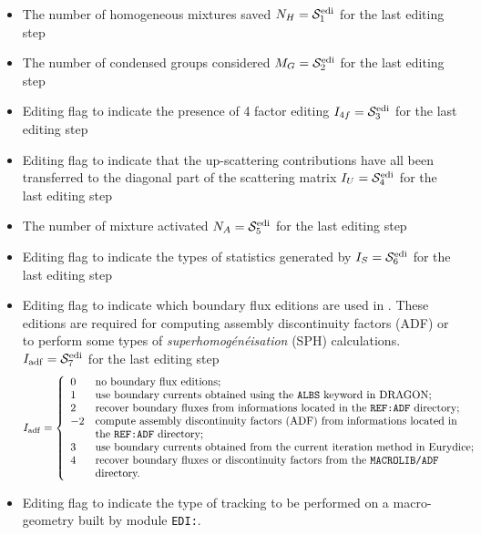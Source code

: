 \begin{itemize}
\item The number of homogeneous mixtures saved $N_{H}=\mathcal{S}^{\rm edi}_{1}$ for the last editing step
\item The number of condensed groups considered $M_{G}=\mathcal{S}^{\rm edi}_{2}$  for the last editing step
\item Editing flag to indicate the presence of 4 factor editing $I_{4f}=\mathcal{S}^{\rm edi}_{3}$ for
the last editing step
\item Editing flag to indicate that the up-scattering contributions have all been transferred to
      the diagonal part of the scattering matrix $I_{U}=\mathcal{S}^{\rm edi}_{4}$ for the last editing step
\item The number of mixture activated $N_{A}=\mathcal{S}^{\rm edi}_{5}$ for the last editing step 
\item Editing flag to indicate the types of statistics generated by 
      $I_{S}=\mathcal{S}^{\rm edi}_{6}$ for the last editing step
\item Editing flag to indicate which boundary flux editions are used in . These editions are required for computing
assembly discontinuity factors (ADF) or to perform some types of {\sl superhomog\'en\'eisation} (SPH) calculations.
      $I_{\rm adf}=\mathcal{S}^{\rm edi}_{7}$ for the last editing step
\begin{displaymath}
I_{\rm adf} = \left\{
\begin{array}{ll}
0 & \textrm{no boundary flux editions;} \\
1 & \textrm{use boundary currents obtained using the \moc{ALBS} keyword in DRAGON;} \\
2 & \textrm{recover boundary fluxes from informations located in the {\tt REF:ADF} directory;} \\
-2 & \textrm{compute assembly discontinuity factors (ADF) from informations located in} \\
  & \textrm{the {\tt REF:ADF} directory;} \\
3 & \textrm{use boundary currents obtained from the current iteration method in Eurydice;} \\
4 & \textrm{recover boundary fluxes or discontinuity factors from the {\tt MACROLIB/ADF}} \\
  & \textrm{directory.} \\
\end{array} \right.
\end{displaymath}
\item Editing flag to indicate the type of tracking to be performed on a macro-geometry built by module {\tt EDI:}.

\end{itemize}
